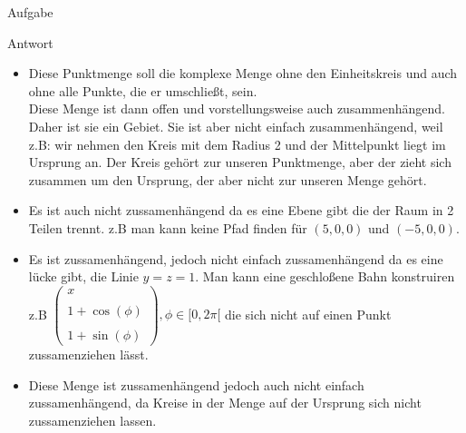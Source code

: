 \documentclass{scrartcl}
\begin{document}
\begin{section}{Aufgabe}
\begin{subsection}{Antwort}
\begin{itemize}
\item[b)] Diese Punktmenge soll die komplexe Menge ohne den Einheitskreis und auch ohne alle Punkte, die er umschließt, sein. \\
Diese Menge ist dann offen und vorstellungsweise auch zusammenhängend. Daher ist sie ein Gebiet. Sie ist aber nicht einfach zusammenhängend, weil z.B: wir nehmen den Kreis mit dem Radius 2 und der Mittelpunkt liegt im Ursprung an. Der Kreis gehört zur unseren Punktmenge, aber der zieht sich zusammen um den Ursprung, der aber nicht zur unseren Menge gehört.\\
\item[c)] Es ist auch nicht zussamenhängend da es eine Ebene gibt die der Raum in 2 Teilen trennt. z.B man kann keine Pfad finden für $(5,0,0)$ und $(-5,0,0)$.
\item[d)] Es ist zussamenhängend, jedoch nicht einfach zussamenhängend da es eine lücke gibt, die Linie $y=z=1$.
Man kann eine geschloßene Bahn konstruiren z.B $\left(
\begin{array}{c}
 x\\\\1+\cos(\phi)\\\\1+\sin(\phi)
\end{array}
\right),\phi\in[0,2\pi[$ die sich nicht auf einen Punkt zussamenziehen lässt.
\item[e)] Diese Menge ist zussamenhängend jedoch auch nicht einfach zussamenhängend, da Kreise in der Menge auf der Ursprung sich nicht zussamenziehen lassen. 
            \end{itemize}
    \end{subsection}  
\end{section}
\end{document}
